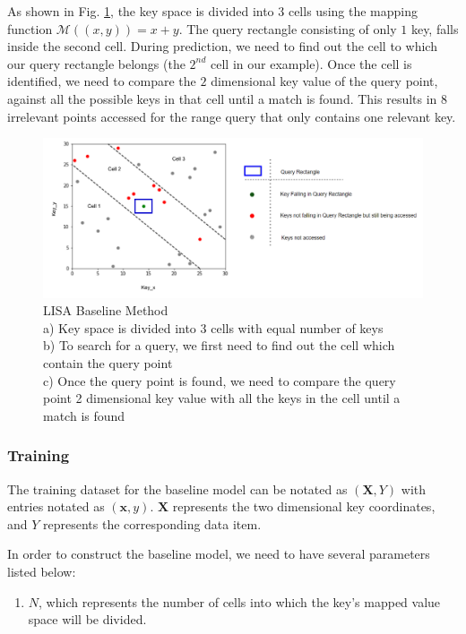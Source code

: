 \begin{mscexample}
As shown in Fig. \ref{fig:BaseLine_Method}, the key space is divided into 3 cells using the mapping function $\mathcal{M}((x,y))= x+y$. The query rectangle consisting of only $1$ key, falls inside the second cell. During prediction, we need to find out the cell to which our query rectangle belongs (the $2^{nd}$ cell in our example). Once the cell is identified, we need to compare the $2$ dimensional key value of the query point, against all the possible keys in that cell until a match is found. This results in $8$ irrelevant points accessed for the range query that only contains one relevant key.
\end{mscexample}

\begin{figure}[t]
    \centering
    \includegraphics[width=1.1\textwidth]{graphs/implementation/Baseline_limitation_new.pdf}
    \caption{LISA Baseline Method \\
    a) Key space is divided into 3 cells with equal number of keys\\
    b) To search for a query, we first need to find out the cell which contain the query point\\
    c) Once the query point is found, we need to compare the query point 2 dimensional key value with all the keys in the cell until a match is found}
    \label{fig:BaseLine_Method}
\end{figure}
\subsubsection{Training}

The training dataset for the baseline model can be notated as $(\boldsymbol{X}, Y)$ with entries notated as $(\boldsymbol{x},y)$. $\boldsymbol{X}$ represents the two dimensional key coordinates, and $Y$ represents the corresponding data item. 

In order to construct the baseline model, we need to have several parameters listed below:
\begin{enumerate}
	\item $N$, which represents the number of cells into which the key's mapped value space will be divided.
\end{enumerate}

